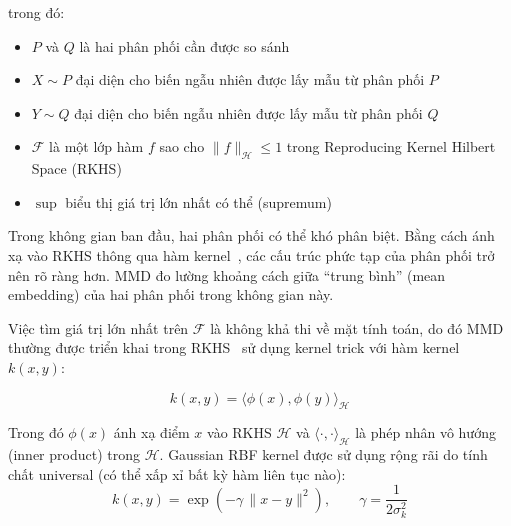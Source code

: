 trong đó:
\begin{itemize}
	\item $P$ và $Q$ là hai phân phối cần được so sánh
	\item $X \sim P$ đại diện cho biến ngẫu nhiên được lấy mẫu từ phân phối $P$
	\item $Y \sim Q$ đại diện cho biến ngẫu nhiên được lấy mẫu từ phân phối $Q$
	\item $\mathcal{F}$ là một lớp hàm $f$ sao cho $\|f\|_{\mathcal{H}} \leq 1$ trong Reproducing Kernel Hilbert Space (RKHS)~\cite{scholkopf2002learning}
	\item $\sup$ biểu thị giá trị lớn nhất có thể (supremum)
\end{itemize}
Trong không gian ban đầu, hai phân phối có thể khó phân biệt. Bằng cách ánh xạ vào RKHS thông qua hàm kernel~\cite{scholkopf2002learning},
các cấu trúc phức tạp của phân phối trở nên rõ ràng hơn. MMD đo lường khoảng cách giữa ``trung bình'' (mean embedding) của hai phân phối trong không gian này.

Việc tìm giá trị lớn nhất trên $\mathcal{F}$ là không khả thi về mặt tính toán, do đó MMD thường được triển khai trong
RKHS~\cite{scholkopf2002learning} sử dụng kernel trick với hàm kernel $k(x, y)$:

\begin{equation}
	k(x, y) = \langle \phi(x), \phi(y) \rangle_{\mathcal{H}}
\end{equation}

Trong đó $\phi(x)$ ánh xạ điểm $x$ vào RKHS $\mathcal{H}$ và $\langle \cdot, \cdot \rangle_{\mathcal{H}}$ là phép nhân vô hướng (inner product) trong $\mathcal{H}$.
Gaussian RBF kernel được sử dụng rộng rãi do tính chất universal (có thể xấp xỉ bất kỳ hàm liên tục nào):
\begin{equation}
	k(x, y) = \exp\left(-\gamma\, \|x - y\|^2\right), \qquad \gamma = \frac{1}{2\sigma_k^2}
\end{equation}

